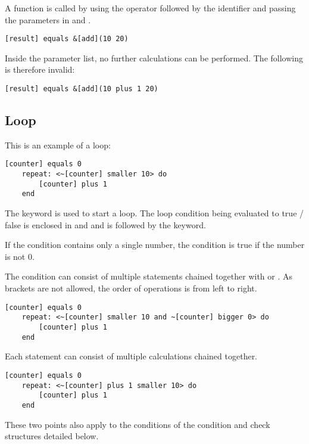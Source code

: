 A function is called by using the \greybox{\&} operator followed by the identifier and passing the parameters in \greybox{(} and \greybox{)}.

\begin{Verbatim}[commandchars=none, frame=single]
    [result] equals &[add](10 20)
\end{Verbatim}

Inside the parameter list, no further calculations can be performed. The following is therefore invalid:

\begin{Verbatim}[commandchars=none, frame=single]
    [result] equals &[add](10 plus 1 20)
\end{Verbatim}

\subsection{Loop}
This is an example of a loop:

\begin{Verbatim}[commandchars=none, frame=single]
    [counter] equals 0
    repeat: <~[counter] smaller 10> do
        [counter] plus 1
    end
\end{Verbatim}

The  keyword is used to start a loop. The loop condition being evaluated to true / false is enclosed in \greybox{<} and \greybox{>} and is followed by the  keyword.

If the condition contains only a single number, the condition is true if the number is not 0.

The condition can consist of multiple statements chained together with  or . As brackets are not allowed, the order of operations is from left to right.

\begin{Verbatim}[commandchars=none, frame=single]
    [counter] equals 0
    repeat: <~[counter] smaller 10 and ~[counter] bigger 0> do
        [counter] plus 1
    end
\end{Verbatim}

Each statement can consist of multiple calculations chained together. 

\begin{Verbatim}[commandchars=none, frame=single]
    [counter] equals 0
    repeat: <~[counter] plus 1 smaller 10> do
        [counter] plus 1
    end
\end{Verbatim}

These two points also apply to the conditions of the condition and check structures detailed below. 

